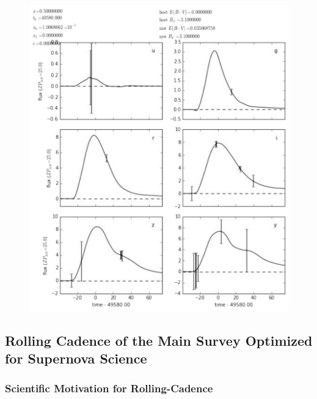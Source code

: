 \begin{figure}[tbh!]
\includegraphics[angle=0,width=0.99\hsize:,clip]{figs/supernova/LCfield00Decp18RA358.pdf}
\caption{}
\label{fig:SNIaLCDecp18}
\end{figure}




\subsection{Rolling Cadence of the Main Survey Optimized for Supernova Science}

\subsubsection{ Scientific Motivation for Rolling-Cadence}

